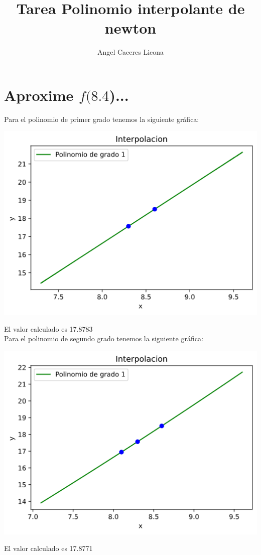 \documentclass{article}
\begin{document}
\title{Tarea Polinomio interpolante de newton}
\author{Angel Caceres Licona}

\maketitle

\section{Aproxime $f(8.4$)...}

Para el polinomio de primer grado tenemos la siguiente gráfica:
\begin{center}
\includegraphics[scale=0.75]{grafica1-1.png}
\end{center}
El valor calculado es 17.8783\\

Para el polinomio de segundo grado tenemos la siguiente gráfica:
\begin{center}
\includegraphics[scale=0.75]{grafica1-2.png}
\end{center}
El valor calculado es 17.8771\\
\end{document}
